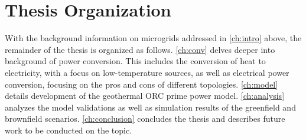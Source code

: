 \section{Thesis Organization}
With the background information on microgrids addressed in \autoref{ch:intro} above, the remainder of the thesis is organized as follows. \autoref{ch:conv} delves deeper into background of power conversion. This includes the conversion of heat to electricity, with a focus on low-temperature sources, as well as electrical power conversion, focusing on the pros and cons of different topologies. 
\autoref{ch:model} details development of the geothermal ORC prime power model. \autoref{ch:analysis} analyzes the model validations as well as simulation results of the greenfield and brownfield scenarios.  \autoref{ch:conclusion} concludes the thesis and describes future work to be conducted on the topic.

\cleardoublepage
